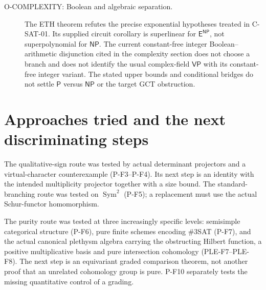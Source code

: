 \begin{description}
\item[O-COMPLEXITY: Boolean and algebraic separation.]
The ETH theorem refutes the precise exponential hypotheses treated in
C-SAT-01. Its supplied circuit corollary is superlinear for
$\mathsf E^{\mathsf{NP}}$, not superpolynomial for $\mathsf{NP}$.
The current constant-free integer Boolean--arithmetic disjunction cited
in the complexity section does not choose a branch and does not identify
the usual complex-field $\mathsf{VP}$ with its constant-free integer
variant. The stated upper bounds and conditional bridges do not settle
$\mathsf P$ versus $\mathsf{NP}$ or the target GCT obstruction.
\end{description}

\section{Approaches tried and the next discriminating steps}
The qualitative-sign route was tested by actual determinant projectors
and a virtual-character counterexample (P-F3--P-F4). Its next step is an
identity with the intended multiplicity projector together with a size
bound. The standard-branching route was tested on $\operatorname{Sym}^2$
(P-F5); a replacement must use the actual Schur-functor homomorphism.

The purity route was tested at three increasingly specific levels:
semisimple categorical structure (P-F6), pure finite schemes encoding
\#3SAT (P-F7), and the actual canonical plethysm algebra carrying the
obstructing Hilbert function, a positive multiplicative basis and pure
intersection cohomology (PLE-F7--PLE-F8). The next step is an
equivariant graded comparison theorem, not another proof that an unrelated
cohomology group is pure. P-F10 separately tests the missing quantitative
control of a grading.


